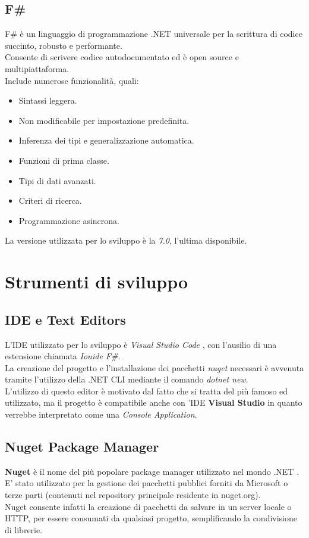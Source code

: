 \documentclass[\main/tesi.tex]{subfiles}
\begin{document}
\subsection{F\#}
F\# \cite{fsharp} è un linguaggio di programmazione .NET \cite{dotnet} universale per la scrittura di codice succinto, robusto e performante. \\
Consente di scrivere codice autodocumentato ed è open source e multipiattaforma. \\
Include numerose funzionalità, quali:
\begin{itemize}
    \item Sintassi leggera.
    \item Non modificabile per impostazione predefinita.
    \item Inferenza dei tipi e generalizzazione automatica.
    \item Funzioni di prima classe.
    \item Tipi di dati avanzati.
    \item Criteri di ricerca.
    \item Programmazione asincrona.
\end{itemize}
La versione utilizzata per lo sviluppo è la \textit{7.0}, l'ultima disponibile.

\section{Strumenti di sviluppo}

\subsection{IDE e Text Editors}
L'IDE utilizzato per lo sviluppo è \textit{Visual Studio Code} \cite{vscode}, con l'ausilio di una estensione chiamata \textit{Ionide F\#}. \\
La creazione del progetto e l'installazione dei pacchetti \textit{nuget} \cite{nuget} necessari è avvenuta tramite l'utilizzo della .NET CLI mediante il comando \textit{dotnet new}. \\
L'utilizzo di questo editor è motivato dal fatto che si tratta del più famoso ed utilizzato, ma il progetto è compatibile anche con 'IDE \textbf{Visual Studio} \cite{visualstudio} in quanto verrebbe interpretato come una \textit{Console Application}. \\

\subsection{Nuget Package Manager}
\textbf{Nuget} \cite{nuget} è il nome del più popolare package manager utilizzato nel mondo .NET \cite{dotnet}.\\
E' stato utilizzato per la gestione dei pacchetti pubblici forniti da Microsoft o terze parti (contenuti nel repository principale residente in nuget.org).\\
Nuget consente infatti la creazione di pacchetti da salvare in un server locale o HTTP, per essere consumati da qualsiasi progetto, semplificando la condivisione di librerie.\\
\end{document}
